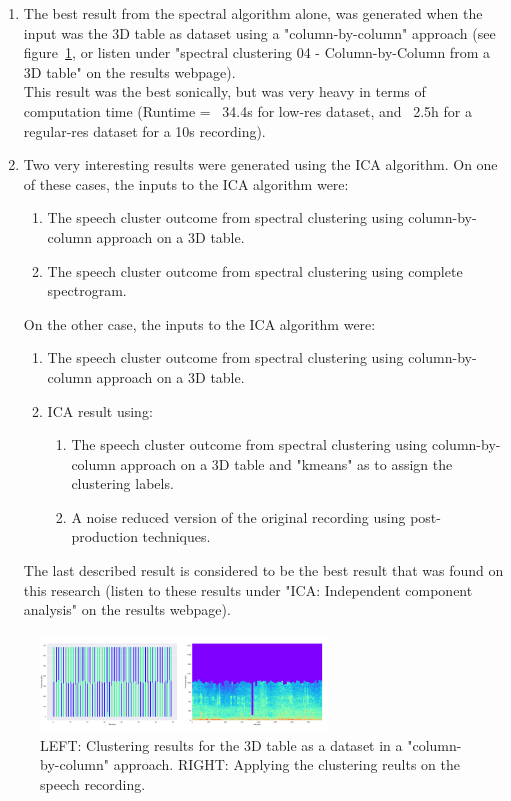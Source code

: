 \documentclass[10pt,twocolumn]{article}
\begin{document}
\begin{enumerate}
\item The best result from the spectral algorithm alone, was generated when the input was the 3D table as dataset using a "column-by-column" approach (see figure~\ref{10}, or listen under "spectral clustering 04 - Column-by-Column from a 3D table" on the results webpage).
\\This result was the best sonically, but was very heavy in terms of computation time (Runtime = ~34.4s for low-res dataset, and ~2.5h for a regular-res dataset for a 10s recording).

\item Two very interesting results were generated using the ICA algorithm. On one of these cases, the inputs to the ICA algorithm were:
\begin{enumerate}
  \item The speech cluster outcome from spectral clustering using column-by-column approach on a 3D table.
  \item The speech cluster outcome from spectral clustering using complete spectrogram.
\end{enumerate}
On the other case, the inputs to the ICA algorithm were:
\begin{enumerate}
  \item The speech cluster outcome from spectral clustering using column-by-column approach on a 3D table.
  \item ICA result using:
  \begin{enumerate}
    \item The speech cluster outcome from spectral clustering using column-by-column approach on a 3D table and "kmeans" as to assign the clustering labels.
    \item A noise reduced version of the original recording using post-production techniques.
  \end{enumerate}
\end{enumerate}
The last described result is considered to be the best result that was found on this research (listen to these results under "ICA: Independent component analysis" on the results webpage).

\end{enumerate}

\begin{figure}[!h]
  \begin{center}
    \includegraphics[width=3in]{images/10.png}
  \end{center}
  \caption{LEFT: Clustering results for the 3D table as a dataset in a "column-by-column" approach. RIGHT: Applying the clustering reults on the speech recording.}
  \label{10}
\end{figure}
\end{document}
